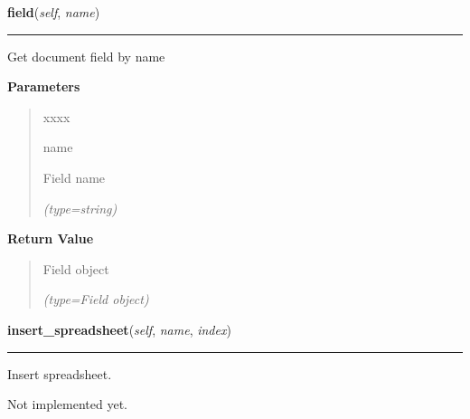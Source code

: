 \hspace{.8\funcindent}\begin{boxedminipage}{\funcwidth}

    \raggedright \textbf{field}(\textit{self}, \textit{name})

    \vspace{-1.5ex}

    \rule{\textwidth}{0.5\fboxrule}
\setlength{\parskip}{2ex}
    Get document field by name

\setlength{\parskip}{1ex}
      \textbf{Parameters}
      \vspace{-1ex}

      \begin{quote}
        \begin{Ventry}{xxxx}

          \item[name]

          Field name

            {\it (type=string)}

        \end{Ventry}

      \end{quote}

      \textbf{Return Value}
    \vspace{-1ex}

      \begin{quote}
      Field object

      {\it (type=Field object)}

      \end{quote}

    \end{boxedminipage}

    \label{src:pylibratm:Fields:insert_spreadsheet}

    \vspace{0.5ex}

\hspace{.8\funcindent}\begin{boxedminipage}{\funcwidth}

    \raggedright \textbf{insert\_spreadsheet}(\textit{self}, \textit{name}, \textit{index})

    \vspace{-1.5ex}

    \rule{\textwidth}{0.5\fboxrule}
\setlength{\parskip}{2ex}
    Insert spreadsheet.

    Not implemented yet.

\setlength{\parskip}{1ex}
    \end{boxedminipage}

